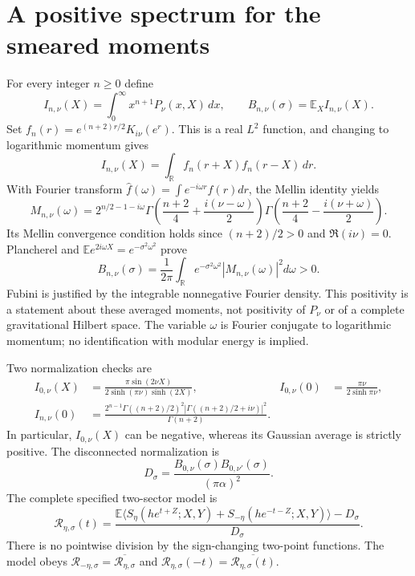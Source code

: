 \documentclass[11pt,a4paper]{article}
\newcommand{\E}{\mathbb E}
\newcommand{\R}{\mathcal R}
\begin{document}
\section{A positive spectrum for the smeared moments}
For every integer $n\geq0$ define
\[
 I_{n,\nu}(X)=\int_0^\infty x^{n+1}P_\nu(x,X)\,dx,
 \qquad B_{n,\nu}(\sigma)=\E_X I_{n,\nu}(X).
\]
Set $f_n(r)=e^{(n+2)r/2}K_{i\nu}(e^r)$. This is a real $L^2$
function, and changing to logarithmic momentum gives
\[
 I_{n,\nu}(X)=\int_{\mathbb R}f_n(r+X)f_n(r-X)\,dr.
\]
With Fourier transform $\widehat f(\omega)=\int e^{-i\omega r}f(r)dr$,
the Mellin identity \cite{dlmfM} yields
\[
 M_{n,\nu}(\omega)=2^{n/2-1-i\omega}
 \Gamma\left(\frac{n+2}{4}+\frac{i(\nu-\omega)}2\right)
 \Gamma\left(\frac{n+2}{4}-\frac{i(\nu+\omega)}2\right).
\]
Its Mellin convergence condition holds since $(n+2)/2>0$ and
$\Re(i\nu)=0$. Plancherel and
$\E e^{2i\omega X}=e^{-\sigma^2\omega^2}$ prove
\begin{equation}
 \boxed{\quad B_{n,\nu}(\sigma)=\frac1{2\pi}\int_{\mathbb R}
 e^{-\sigma^2\omega^2}|M_{n,\nu}(\omega)|^2d\omega>0.\quad}\label{eq:B}
\end{equation}
Fubini is justified by the integrable nonnegative Fourier density.
This positivity is a statement about these averaged moments, not
positivity of $P_\nu$ or of a complete gravitational Hilbert space.
The variable $\omega$ is Fourier conjugate to logarithmic momentum;
no identification with modular energy is implied.

Two normalization checks are
\begin{align*}
 I_{0,\nu}(X)&=\frac{\pi\sin(2\nu X)}{2\sinh(\pi\nu)\sinh(2X)},
 &I_{0,\nu}(0)&=\frac{\pi\nu}{2\sinh\pi\nu},\\
 I_{n,\nu}(0)&=\frac{2^{n-1}\Gamma((n+2)/2)^2
 |\Gamma((n+2)/2+i\nu)|^2}{\Gamma(n+2)}.
\end{align*}
In particular, $I_{0,\nu}(X)$ can be negative, whereas its Gaussian
average is strictly positive. The disconnected normalization is
\begin{equation}
 D_\sigma=\frac{B_{0,\nu}(\sigma)B_{0,\nu'}(\sigma)}{(\pi\alpha)^2}.
\end{equation}
The complete specified two-sector model is
\begin{equation}
 \R_{\eta,\sigma}(t)=\frac{\E\langle
 S_\eta(he^{t+Z};X,Y)+S_{-\eta}(he^{-t-Z};X,Y)
 \rangle-D_\sigma}{D_\sigma}.\label{eq:R}
\end{equation}
There is no pointwise division by the sign-changing two-point
functions. The model obeys $\R_{-\eta,\sigma}=\overline{\R_{\eta,\sigma}}$
and $\R_{\eta,\sigma}(-t)=\overline{\R_{\eta,\sigma}(t)}$.
\end{document}
